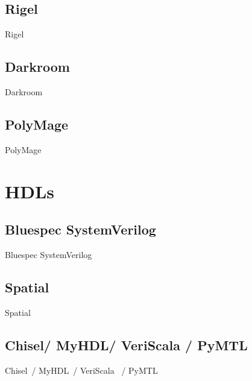 \subsection{Rigel}
Rigel~\cite{hegarty_2016_rigel}
%

\subsection{Darkroom}
Darkroom~\cite{darkroom}
%

\subsection{PolyMage}
PolyMage~\cite{mullapudi_asplos_2015_polymage}


\section{HDLs}
%
\subsection{Bluespec SystemVerilog}
Bluespec SystemVerilog~\cite{bluespec}
% 

\subsection{Spatial}
Spatial~\cite{david_PLDI_2018_spatial, prabhakar_asplos_2016_parallelpattern}


\subsection{Chisel/ MyHDL/ VeriScala / PyMTL}
Chisel~\cite{bachrach_dac_2012_chisel}/ MyHDL~\cite{decaluwe_2004_myhdl}/ VeriScala~\cite{liu_2017_scala} / PyMTL~\cite{lockhart_ISCA_2014_pymtl}
%

